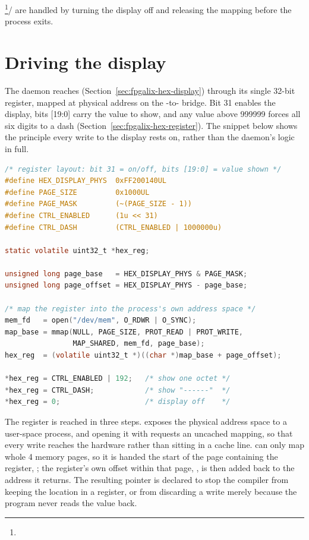 \footnote{}/ are handled by turning the display off and releasing the mapping before the process exits.

\section{Driving the display}
\label{sec:fpgalix-hexip-driving}

The daemon reaches  (Section~\ref{sec:fpgalix-hex-display}) through its single 32-bit register, mapped at physical address  on the -to- bridge. Bit 31 enables the display, bits [19:0] carry the value to show, and any value above 999999 forces all six digits to a dash (Section~\ref{sec:fpgalix-hex-register}). The snippet below shows the principle every write to the display rests on, rather than the daemon's logic in full.

\begin{lstlisting}[language=C]
/* register layout: bit 31 = on/off, bits [19:0] = value shown */
#define HEX_DISPLAY_PHYS  0xFF200140UL
#define PAGE_SIZE         0x1000UL
#define PAGE_MASK         (~(PAGE_SIZE - 1))
#define CTRL_ENABLED      (1u << 31)
#define CTRL_DASH         (CTRL_ENABLED | 1000000u)

static volatile uint32_t *hex_reg;

unsigned long page_base   = HEX_DISPLAY_PHYS & PAGE_MASK;
unsigned long page_offset = HEX_DISPLAY_PHYS - page_base;

/* map the register into the process's own address space */
mem_fd   = open("/dev/mem", O_RDWR | O_SYNC);
map_base = mmap(NULL, PAGE_SIZE, PROT_READ | PROT_WRITE,
                MAP_SHARED, mem_fd, page_base);
hex_reg  = (volatile uint32_t *)((char *)map_base + page_offset);

*hex_reg = CTRL_ENABLED | 192;   /* show one octet */
*hex_reg = CTRL_DASH;            /* show "------"  */
*hex_reg = 0;                    /* display off    */
\end{lstlisting}

The register is reached in three steps.  exposes the physical address space to a user-space process, and opening it with  requests an uncached mapping, so that every write reaches the hardware rather than sitting in a cache line.  can only map whole 4  memory pages, so it is handed the start of the page containing the register, ; the register's own offset within that page, , is then added back to the address it returns. The resulting pointer is declared  to stop the compiler from keeping the location in a register, or from discarding a write merely because the program never reads the value back.

